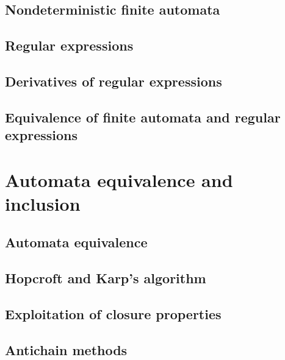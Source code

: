 \subsection{Nondeterministic finite automata}

\subsection{Regular expressions}

\subsection{Derivatives of regular expressions}

\subsection{Equivalence of finite automata and regular expressions}

\section{Automata equivalence and inclusion}

\subsection{Automata equivalence}

\subsection{Hopcroft and Karp's algorithm}

\subsection{Exploitation of closure properties}

\subsection{Antichain methods}

